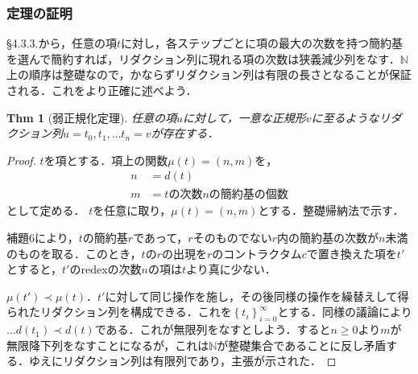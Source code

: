 \documentclass[a4paper,10pt,platex, dvipdfmx]{jsarticle}
\newtheorem{thm}{Thm}
\begin{document}
\subsubsection{定理の証明}
\S4.3.3.から，任意の項$t$に対し，各ステップごとに項の最大の次数を持つ簡約基を選んで簡約すれば，リダクション列に現れる項の次数は狭義減少列をなす．$\mathbb{N}$上の順序は整礎なので，かならずリダクション列は有限の長さとなることが保証される．これをより正確に述べよう．
\begin{thm}[弱正規化定理]
任意の項$u$に対して，一意な正規形$v$に至るようなリダクション列$u = t_{0},t_{1},\ldots t_{n} = v$が存在する．
\end{thm}
\begin{proof}
$t$を項とする．項上の関数$\mu(t) = \left(n, m\right)$を，\begin{align*}
n &= d(t)\\
m &=t\text{の次数}n\text{の簡約基の個数}
\end{align*}
として定める．
$t$を任意に取り，$\mu(t) =(n, m)$とする．整礎帰納法で示す．

補題6により，$t$の簡約基$r$であって，$r$そのものでない$r$内の簡約基の次数が$n$未満のものを取る．このとき，$t$の$r$の出現を$r$のコントラクタム$c$で置き換えた項を$t'$とすると，$t'$のredexの次数$n$の項は$t$より真に少ない．

$\mu(t') \prec \mu(t)$．$t'$に対して同じ操作を施し，その後同様の操作を繰替えして得られたリダクション列を構成できる．これを$\left\{t_{i}\right\}_{i = 0}^{\infty}$とする．同様の議論により$\ldots d(t_{1}) \prec d(t)$である．これが無限列をなすとしよう．すると$n \geq 0$より$m$が無限降下列をなすことになるが，これは$\mathbb{N}$が整礎集合であることに反し矛盾する．ゆえにリダクション列は有限列であり，主張が示された．
\end{proof}
\end{document}
